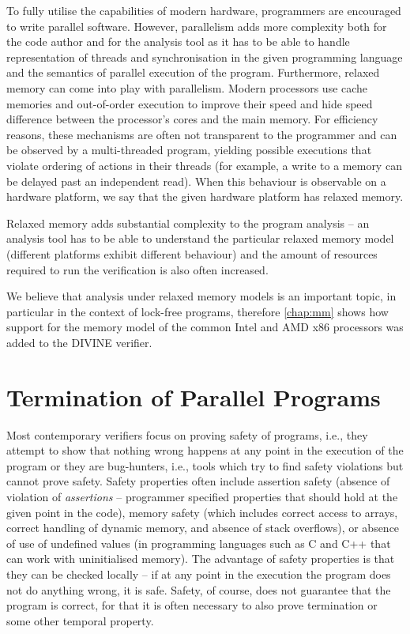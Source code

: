 To fully utilise the capabilities of modern hardware, programmers are encouraged to write parallel software.
However, parallelism adds more complexity both for the code author and for the analysis tool as it has to be able to handle representation of threads and synchronisation in the given programming language and the semantics of parallel execution of the program.
Furthermore, relaxed memory can come into play with parallelism.
Modern processors use cache memories and out-of-order execution to improve their speed and hide speed difference between the processor's cores and the main memory.
For efficiency reasons, these mechanisms are often not transparent to the programmer and can be observed by a multi-threaded program, yielding possible executions that violate ordering of actions in their threads (for example, a write to a memory can be delayed past an independent read).
When this behaviour is observable on a hardware platform, we say that the given hardware platform has relaxed memory.

Relaxed memory adds substantial complexity to the program analysis --
an analysis tool has to be able to understand the particular relaxed memory model (different platforms exhibit different behaviour) and the amount of resources required to run the verification is also often increased.

We believe that analysis under relaxed memory models is an important topic,
in particular in the context of lock-free programs, therefore \autoref{chap:mm}
shows how support for the memory model of the common Intel and AMD x86
processors was added to the DIVINE verifier.

\section{Termination of Parallel Programs}

Most contemporary verifiers focus on proving safety of programs, i.e., they
attempt to show that nothing wrong happens at any point in the execution of the
program or they are bug-hunters, i.e., tools which try to find safety violations but cannot prove safety.
Safety properties often include assertion safety (absence of violation of \emph{assertions} -- programmer specified properties that should hold at the given point in the code), memory safety (which includes correct access to arrays, correct handling of dynamic memory, and absence of stack overflows), or absence of use of undefined values (in programming languages such as C and C++ that can work with uninitialised memory).
The advantage of safety properties is that they can be checked locally -- if at
any point in the execution the program does not do anything wrong, it is safe.
Safety, of course, does not guarantee that the program is correct, for that it is often necessary to also prove termination or some other temporal property.

